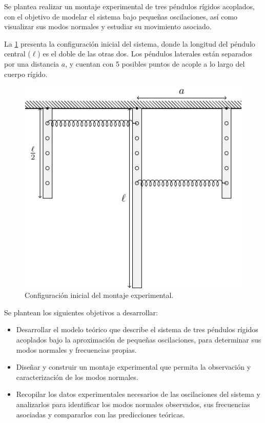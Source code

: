 
Se plantea realizar un montaje experimental de tres péndulos
rígidos acoplados, con el objetivo de modelar el sistema bajo
pequeñas oscilaciones, así como visualizar sus modos normales
y estudiar su movimiento asociado.

La \cref{fig:system-diagram} presenta la configuración inicial
del sistema, donde la longitud del péndulo central (\( \ell \))
es el doble de las otras dos. Los péndulos laterales están
separados por una distancia \( a \), y cuentan con 5 posibles
puntos de acople a lo largo del cuerpo rígido.

\begin{figure}[htbp!]
	\centering
	\includegraphics[width=0.75\linewidth]{./Figures/system-diagram.pdf}
	\caption{Configuración inicial del montaje experimental.}
	\label{fig:system-diagram}
\end{figure}

Se plantean los siguientes objetivos a desarrollar:

\begin{itemize}
	\item Desarrollar el modelo teórico que describe el sistema de
		tres péndulos rígidos acoplados bajo la aproximación de pequeñas
		oscilaciones, para determinar sus modos normales y frecuencias propias.
	\item Diseñar y construir un montaje experimental que permita la observación
		y caracterización de los modos normales.
	\item Recopilar los datos experimentales necesarios de las oscilaciones del
		sistema y analizarlos para identificar los modos normales observados,
		sus frecuencias asociadas y compararlos con las predicciones teóricas.
\end{itemize}
